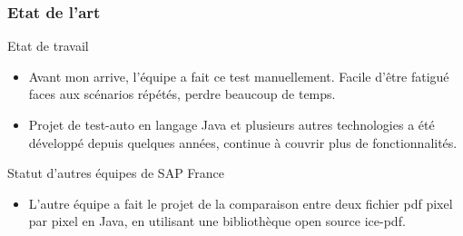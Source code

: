 \documentclass{beamer}
\begin{document}
        \begin{frame}[t]
            \frametitle{Etat de l'art}
            \begin{block}{Etat de travail}
                \begin{itemize}
                    \item Avant mon arrive, l'équipe a fait ce test manuellement. Facile d’être fatigué faces aux scénarios répétés, perdre beaucoup de temps. 
                    \item Projet de test-auto en langage Java et plusieurs autres technologies a été développé depuis quelques années, continue à couvrir plus de fonctionnalités.
                \end{itemize}
            \end{block}
            \pause
            
            \begin{block}{Statut d'autres équipes de SAP France}
                \begin{itemize}
                    \item L'autre équipe a fait le projet de la comparaison entre deux fichier pdf pixel par pixel en Java, en utilisant une bibliothèque open source ice-pdf.
                \end{itemize}
            \end{block}
            
        \end{frame}
\end{document}
